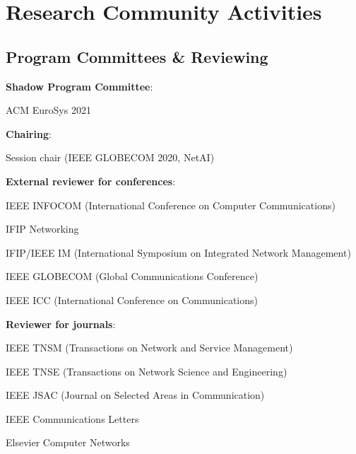 \section{Research Community Activities}
\subsection{Program Committees \& Reviewing}
\begin{cvitemize}
	\item \textbf{Shadow Program Committee}:
	\begin{inlineItemize}
		\item ACM EuroSys 2021
	\end{inlineItemize}
	\item \textbf{Chairing}:
	\begin{inlineItemize}
		\item Session chair (IEEE GLOBECOM 2020, NetAI)
	\end{inlineItemize}
	\item \textbf{External reviewer for conferences}:
	\begin{inlineItemize}
		\item IEEE INFOCOM (International Conference on Computer Communications)
		\item IFIP Networking
		\item IFIP/IEEE IM (International Symposium on Integrated Network Management)
		\item IEEE GLOBECOM (Global Communications Conference)
		\item IEEE ICC (International Conference on Communications)
	\end{inlineItemize}
	\item \textbf{Reviewer for journals}:
	\begin{inlineItemize}
		\item IEEE TNSM (Transactions on Network and Service Management)
		\item IEEE TNSE (Transactions on Network Science and Engineering)
		\item IEEE JSAC (Journal on Selected Areas in Communication)
		\item IEEE Communications Letters
		\item Elsevier Computer Networks
	\end{inlineItemize}
\end{cvitemize}

